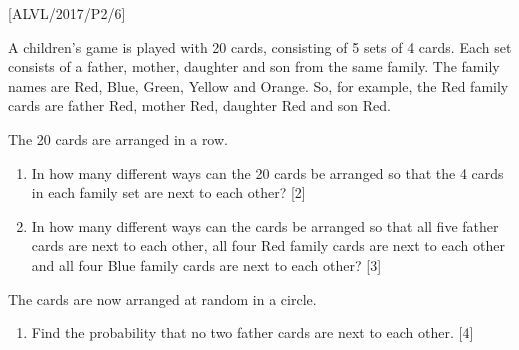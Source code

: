 \item {[}ALVL/2017/P2/6{]}

A children\textquoteright s game is played with 20 cards, consisting
of 5 sets of 4 cards. Each set consists of a father, mother, daughter
and son from the same family. The family names are Red, Blue, Green,
Yellow and Orange. So, for example, the Red family cards are father
Red, mother Red, daughter Red and son Red. 

The 20 cards are arranged in a row. 
\begin{enumerate}
\item In how many different ways can the 20 cards be arranged so that the
4 cards in each family set are next to each other? \hfill{}{[}2{]}
\item In how many different ways can the cards be arranged so that all five
father cards are next to each other, all four Red family cards are
next to each other and all four Blue family cards are next to each
other? \hfill{}{[}3{]}
\end{enumerate}
The cards are now arranged at random in a circle. 
\begin{enumerate}
\item Find the probability that no two father cards are next to each other.
\hfill{}{[}4{]}
\end{enumerate}

